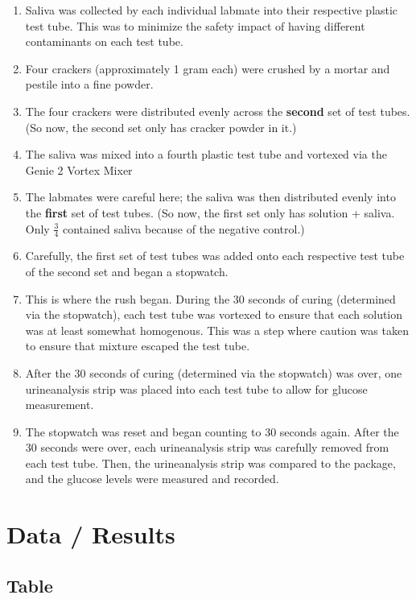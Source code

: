 \documentclass[letterpaper]{article}
\def\tightlist{}
\begin{document}
\begin{doublespace}
\begin{enumerate}
\def\labelenumi{\arabic{enumi}.}
\tightlist
\item
  Saliva was collected by each individual labmate into their respective plastic test tube. This was to minimize the safety impact of having different contaminants on each test tube.
\item
  Four crackers (approximately 1 gram each) were crushed by a mortar and pestile into a fine powder.
\item
  The four crackers were distributed evenly across the \textbf{second} set of test tubes. (So now, the second set only has cracker powder in it.)
\item
  The saliva was mixed into a fourth plastic test tube and vortexed via the Genie 2 Vortex Mixer
\item
  The labmates were careful here; the saliva was then distributed evenly into the \textbf{first} set of test tubes. (So now, the first set only has solution + saliva. Only \(\frac{3}{4}\) contained saliva because of the negative control.)
\item
  Carefully, the first set of test tubes was added onto each respective test tube of the second set and began a stopwatch.
\item
  This is where the rush began. During the 30 seconds of curing (determined via the stopwatch), each test tube was vortexed to ensure that each solution was at least somewhat homogenous. This was a step where caution was taken to ensure that mixture escaped the test tube.
\item
  After the 30 seconds of curing (determined via the stopwatch) was over, one urineanalysis strip was placed into each test tube to allow for glucose measurement.
\item
  The stopwatch was reset and began counting to 30 seconds again. After the 30 seconds were over, each urineanalysis strip was carefully removed from each test tube. Then, the urineanalysis strip was compared to the package, and the glucose levels were measured and recorded.
\end{enumerate}

\section{Data / Results}\label{data-results}

\subsection{Table}\label{table}


\end{doublespace}
\end{document}
